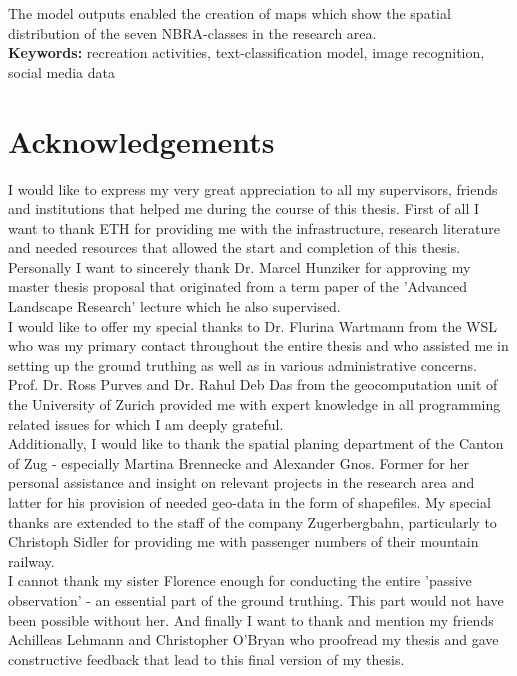 The model outputs enabled the creation of maps which show the spatial distribution of the seven NBRA-classes in the research area. \\
\newline
\textbf{Keywords:} recreation activities, text-classification model, image recognition, social media data

\cleardoublepage

\chapter*{Acknowledgements} \label{acknowledgements}
I would like to express my very great appreciation to all my supervisors, friends and institutions that helped me during the course of this thesis. First of all I want to thank ETH for providing me with the infrastructure, research literature and needed resources that allowed the start and completion of this thesis.\\
Personally I want to sincerely thank Dr. Marcel Hunziker for approving my master thesis proposal that originated from a term paper of the 'Advanced Landscape Research' lecture which he also supervised. \\
I would like to offer my special thanks to Dr. Flurina Wartmann from the WSL who was my primary contact throughout the entire thesis and who assisted me in setting up the ground truthing as well as in various administrative concerns. \\
Prof. Dr. Ross Purves and Dr. Rahul Deb Das from the geocomputation unit of the University of Zurich provided me with expert knowledge in all programming related issues for which I am deeply grateful.\\
\newline
Additionally, I would like to thank the spatial planing department of the Canton of Zug - especially Martina Brennecke and Alexander Gnos. Former for her personal assistance and insight on relevant projects in the research area and latter for his provision of needed geo-data in the form of shapefiles. My special thanks are extended to the staff of the company Zugerbergbahn, particularly to Christoph Sidler for providing me with passenger numbers of their mountain railway. \\
\newline
I cannot thank my sister Florence enough for conducting the entire 'passive observation' - an essential part of the ground truthing. This part would not have been possible without her. And finally I want to thank and mention my friends Achilleas Lehmann and Christopher O'Bryan who proofread my thesis and gave constructive feedback that lead to this final version of my thesis.

